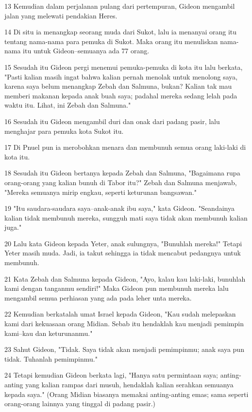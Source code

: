 \par 13 Kemudian dalam perjalanan pulang dari pertempuran, Gideon mengambil jalan yang melewati pendakian Heres.
\par 14 Di situ ia menangkap seorang muda dari Sukot, lalu ia menanyai orang itu tentang nama-nama para pemuka di Sukot. Maka orang itu menuliskan nama-nama itu untuk Gideon--semuanya ada 77 orang.
\par 15 Sesudah itu Gideon pergi menemui pemuka-pemuka di kota itu lalu berkata, "Pasti kalian masih ingat bahwa kalian pernah menolak untuk menolong saya, karena saya belum menangkap Zebah dan Salmuna, bukan? Kalian tak mau memberi makanan kepada anak buah saya; padahal mereka sedang lelah pada waktu itu. Lihat, ini Zebah dan Salmuna."
\par 16 Sesudah itu Gideon mengambil duri dan onak dari padang pasir, lalu menghajar para pemuka kota Sukot itu.
\par 17 Di Pnuel pun ia merobohkan menara dan membunuh semua orang laki-laki di kota itu.
\par 18 Sesudah itu Gideon bertanya kepada Zebah dan Salmuna, "Bagaimana rupa orang-orang yang kalian bunuh di Tabor itu?" Zebah dan Salmuna menjawab, "Mereka semuanya mirip engkau, seperti keturunan bangsawan."
\par 19 "Itu saudara-saudara saya--anak-anak ibu saya," kata Gideon. "Seandainya kalian tidak membunuh mereka, sungguh mati saya tidak akan membunuh kalian juga."
\par 20 Lalu kata Gideon kepada Yeter, anak sulungnya, "Bunuhlah mereka!" Tetapi Yeter masih muda. Jadi, ia takut sehingga ia tidak mencabut pedangnya untuk membunuh.
\par 21 Kata Zebah dan Salmuna kepada Gideon, "Ayo, kalau kau laki-laki, bunuhlah kami dengan tanganmu sendiri!" Maka Gideon pun membunuh mereka lalu mengambil semua perhiasan yang ada pada leher unta mereka.
\par 22 Kemudian berkatalah umat Israel kepada Gideon, "Kau sudah melepaskan kami dari kekuasaan orang Midian. Sebab itu hendaklah kau menjadi pemimpin kami--kau dan keturunanmu."
\par 23 Sahut Gideon, "Tidak. Saya tidak akan menjadi pemimpinmu; anak saya pun tidak. Tuhanlah pemimpinmu."
\par 24 Tetapi kemudian Gideon berkata lagi, "Hanya satu permintaan saya; anting-anting yang kalian rampas dari musuh, hendaklah kalian serahkan semuanya kepada saya." (Orang Midian biasanya memakai anting-anting emas; sama seperti orang-orang lainnya yang tinggal di padang pasir.)

